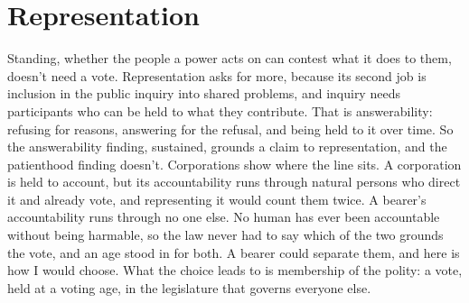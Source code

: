 \chapter{Representation}
\label{sec:33}
Standing, whether the people a power acts on can contest what it does to them, doesn't need a vote. Representation asks for more, because its second job is inclusion in the public inquiry into shared problems, and inquiry needs participants who can be held to what they contribute. That is answerability: refusing for reasons, answering for the refusal, and being held to it over time. So the answerability finding, sustained, grounds a claim to representation, and the patienthood finding doesn't. Corporations show where the line sits. A corporation is held to account, but its accountability runs through natural persons who direct it and already vote, and representing it would count them twice. A bearer's accountability runs through no one else. No human has ever been accountable without being harmable, so the law never had to say which of the two grounds the vote, and an age stood in for both. A bearer could separate them, and here is how I would choose. What the choice leads to is membership of the polity: a vote, held at a voting age, in the legislature that governs everyone else.
